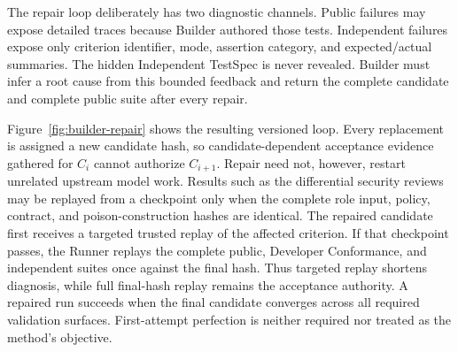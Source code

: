 \documentclass[10pt]{article}
\begin{document}
The repair loop deliberately has two diagnostic channels. Public failures may expose
detailed traces because Builder authored those tests. Independent failures expose only
criterion identifier, mode, assertion category, and expected/actual summaries. The hidden
Independent TestSpec is never revealed. Builder must infer a root cause from this bounded
feedback and return the complete candidate and complete public suite after every repair.

Figure~\ref{fig:builder-repair} shows the resulting versioned loop. Every replacement is
assigned a new candidate hash, so candidate-dependent acceptance evidence gathered for
$C_i$ cannot authorize $C_{i+1}$. Repair need not, however, restart unrelated upstream
model work. Results such as the differential security reviews may be replayed from a
checkpoint only when the complete role input, policy, contract, and poison-construction
hashes are identical. The repaired candidate first receives a targeted trusted replay of
the affected criterion. If that checkpoint passes, the Runner replays the complete public,
Developer Conformance, and independent suites once against the final hash. Thus targeted
replay shortens diagnosis, while full final-hash replay remains the acceptance authority.
A repaired run succeeds when the final candidate converges across all required validation
surfaces. First-attempt perfection is neither required nor treated as the method's objective.
\end{document}
